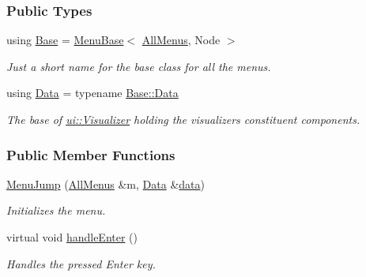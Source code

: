 \subsubsection*{Public Types}
\begin{DoxyCompactItemize}
\item 
using \hyperlink{structMenuJump_a952d472d8b18d23f60e8efa4b41c0b5d}{Base} = \hyperlink{structMenuBase}{Menu\+Base}$<$ \hyperlink{structAllMenus}{All\+Menus}, Node $>$\hypertarget{structMenuJump_a952d472d8b18d23f60e8efa4b41c0b5d}{}\label{structMenuJump_a952d472d8b18d23f60e8efa4b41c0b5d}

\begin{DoxyCompactList}\small\item\em Just a short name for the base class for all the menus. \end{DoxyCompactList}\item 
using \hyperlink{structMenuJump_abef8468fe2c6460266f46d2c38f101e7}{Data} = typename \hyperlink{structMenuBase_a473a45fd8adbc75a9220b64753ae3837}{Base\+::\+Data}\hypertarget{structMenuJump_abef8468fe2c6460266f46d2c38f101e7}{}\label{structMenuJump_abef8468fe2c6460266f46d2c38f101e7}

\begin{DoxyCompactList}\small\item\em The base of \hyperlink{structui_1_1Visualizer}{ui\+::\+Visualizer} holding the visualizer\textquotesingle{}s constituent components. \end{DoxyCompactList}\end{DoxyCompactItemize}
\subsubsection*{Public Member Functions}
\begin{DoxyCompactItemize}
\item 
\hyperlink{structMenuJump_a1f155cbbec7c4ba3649d0b798993846d}{Menu\+Jump} (\hyperlink{structAllMenus}{All\+Menus} \&m, \hyperlink{structMenuBase_a473a45fd8adbc75a9220b64753ae3837}{Data} \&\hyperlink{structMenuBase_a819aaaa06ede3bffbb12c1390657ef64}{data})
\begin{DoxyCompactList}\small\item\em Initializes the menu. \end{DoxyCompactList}\item 
virtual void \hyperlink{structMenuJump_a5af21043aa5645fcc573dc56b088749f}{handle\+Enter} ()\hypertarget{structMenuJump_a5af21043aa5645fcc573dc56b088749f}{}\label{structMenuJump_a5af21043aa5645fcc573dc56b088749f}

\begin{DoxyCompactList}\small\item\em Handles the pressed Enter key. \end{DoxyCompactList}\end{DoxyCompactItemize}
